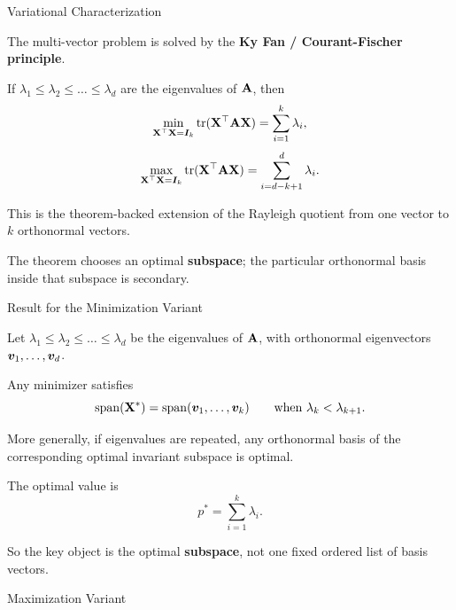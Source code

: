 \documentclass[11pt,compress,t,notes=noshow, xcolor=table]{beamer}
\begin{document}
\begin{framei}[fs=small]{Variational Characterization}
\item The multi-vector problem is solved by the \textbf{Ky Fan / Courant-Fischer principle}.
\item If $\lambda_1 \le \lambda_2 \le \dots \le \lambda_d$ are the eigenvalues of $\mathbf{A}$, then
$$
\min_{\mathbf{X}^\top \mathbf{X} = \bm{I}_k} \operatorname{tr}(\mathbf{X}^\top \mathbf{A} \mathbf{X})
=
\sum_{i=1}^k \lambda_i,
$$
\[
\max_{\mathbf{X}^\top \mathbf{X} = \bm{I}_k} \operatorname{tr}(\mathbf{X}^\top \mathbf{A} \mathbf{X})
=
\sum_{i=d-k+1}^d \lambda_i.
\]
\item This is the theorem-backed extension of the Rayleigh quotient from one vector to $k$ orthonormal vectors.
\item The theorem chooses an optimal \textbf{subspace}; the particular orthonormal basis inside that subspace is secondary.
\end{framei}


\begin{framei}[fs=small]{Result for the Minimization Variant}
\item Let $\lambda_1 \le \lambda_2 \le \dots \le \lambda_d$ be the eigenvalues of $\mathbf{A}$, with orthonormal eigenvectors $\bm{v}_1,\dots,\bm{v}_d$.
\item Any minimizer satisfies
$$
\operatorname{span}(\mathbf{X}^\ast)
=
\operatorname{span}(\bm{v}_1,\dots,\bm{v}_k)
\qquad
\text{when } \lambda_k < \lambda_{k+1}.
$$
\item More generally, if eigenvalues are repeated, any orthonormal basis of the corresponding optimal invariant subspace is optimal.
\item The optimal value is
\[
p^\ast = \sum_{i=1}^k \lambda_i.
\]
\item So the key object is the optimal \textbf{subspace}, not one fixed ordered list of basis vectors.
\end{framei}


\begin{framev}[fs=small]{Maximization Variant}
\end{framev}
\end{document}
